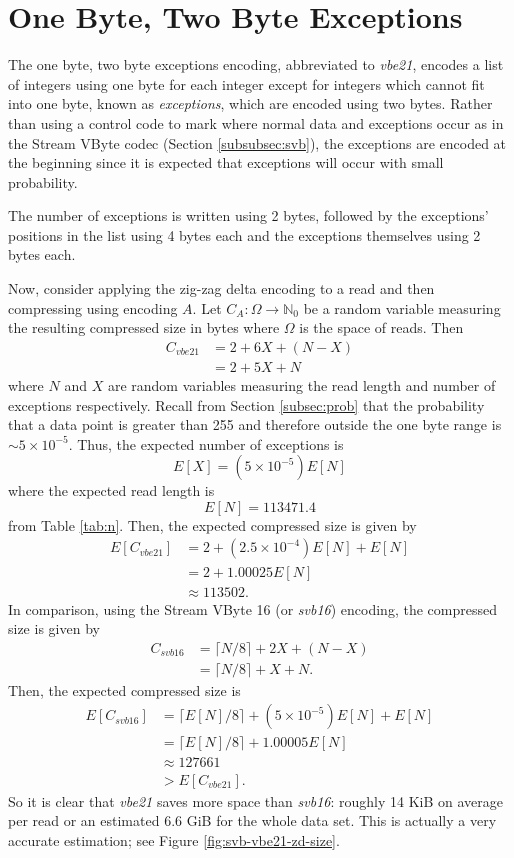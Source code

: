 \section{One Byte, Two Byte Exceptions}
\label{sec:vbbe21}

The one byte, two byte exceptions encoding, abbreviated to \textit{vbe21}, encodes a list of integers using one byte for each integer except for integers which cannot fit into one byte, known as \textit{exceptions}, which are encoded using two bytes. Rather than using a control code to mark where normal data and exceptions occur as in the Stream VByte codec (Section \ref{subsubsec:svb}), the exceptions are encoded at the beginning since it is expected that exceptions will occur with small probability.

The number of exceptions is written using 2 bytes, followed by the exceptions' positions in the list using 4 bytes each and the exceptions themselves using 2 bytes each.

Now, consider applying the zig-zag delta encoding to a read and then compressing using encoding $A$. Let $C_A:\Omega\to\mathbb{N}_0$ be a random variable measuring the resulting compressed size in bytes where $\Omega$ is the space of reads. Then
\begin{align*}
	C_{vbe21} &= 2 + 6X + (N - X)\\
	&= 2 + 5X + N
\end{align*}
where $N$ and $X$ are random variables measuring the read length and number of exceptions respectively.
Recall from Section \ref{subsec:prob} that the probability that a data point is greater than 255 and therefore outside the one byte range is $\sim 5\times 10^{-5}$. Thus, the expected number of exceptions is
\[ E[X] = (5 \times 10^{-5})E[N] \]
where the expected read length is
\[ E[N] = 113471.4 \]
from Table \ref{tab:n}.
Then, the expected compressed size is given by
\begin{align*}
	E[C_{vbe21}] &= 2 + (2.5\times 10^{-4})E[N]+ E[N]\\
	&= 2 + 1.00025E[N]\\
	&\approx 113502.
\end{align*}
In comparison, using the Stream VByte 16 (or \textit{svb16}) encoding, the compressed size is given by
\begin{align*}
	C_{svb16} &= \lceil N/8 \rceil + 2X + (N - X)\\
	&= \lceil N/8 \rceil + X + N.
\end{align*}
Then, the expected compressed size is
\begin{align*}
	E[C_{svb16}] &= \lceil E[N]/8 \rceil + (5 \times 10^{-5})E[N] + E[N]\\
	&= \lceil E[N]/8 \rceil + 1.00005E[N]\\
	&\approx 127661\\
	&> E[C_{vbe21}].
\end{align*}
So it is clear that \textit{vbe21} saves more space than \textit{svb16}: roughly 14 KiB on average per read or an estimated 6.6 GiB for the whole data set. This is actually a very accurate estimation; see Figure \ref{fig:svb-vbe21-zd-size}.

